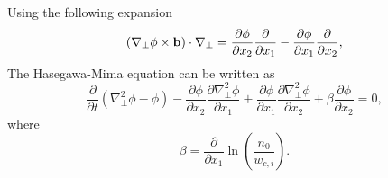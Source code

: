 \documentclass[oneside,a4paper,11pt]{report}
\begin{document}
Using the following expansion
\begin{equation}
    \left ( \nabla_\perp \phi \times \mathbf{b} \right ) \cdot \nabla_\perp = \frac{\partial \phi}{\partial x_2} \frac{\partial}{\partial x_1} - \frac{\partial \phi}{\partial x_1} \frac{\partial}{\partial x_2},
\end{equation}
The Hasegawa-Mima equation can be written as
\begin{equation}
   \frac{\partial}{\partial t}\left ( \nabla_\perp^2 \phi - \phi \right ) - \frac{\partial \phi}{\partial x_2} \frac{\partial \nabla_\perp^2 \phi}{\partial x_1} + \frac{\partial \phi}{\partial x_1} \frac{\partial \nabla_\perp^2 \phi}{\partial x_2} + \beta \frac{\partial \phi}{\partial x_2} = 0,
\end{equation}
where 
\begin{equation}
    \beta = \frac{\partial}{\partial x_1} \ln \left ( \frac{n_0}{w_{c,i}} \right ).
\end{equation}

\end{document}
